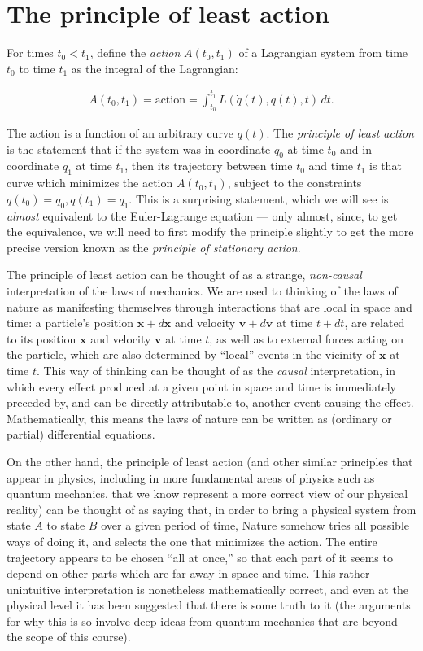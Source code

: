 \documentclass[11pt]{report}
\theoremstyle{plain}
\theoremstyle{definition}
\begin{document}
\section{The principle of least action}
For times $t_0<t_1$, define the \emph{action} $A(t_0,t_1)$
of a Lagrangian system from time $t_0$ to time $t_1$
as the integral of the Lagrangian:

\begin{align*}
A(t_0,t_1)=\textrm{action} = \int_{t_0}^{t_1} L(\dot{q}(t),q(t),t)\,dt.
\end{align*}

The action is a function of an arbitrary curve $q(t)$.
The \emph{principle of least action} is the statement that
if the system was in coordinate $q_0$ at time $t_0$
and in coordinate $q_1$ at time $t_1$, then its
trajectory between time $t_0$ and time $t_1$ is that
curve which minimizes the action $A(t_0,t_1)$,
subject to the constraints $q(t_0)=q_0, q(t_1)=q_1$.
This is a surprising statement, which we will see is
\emph{almost} equivalent to the Euler-Lagrange equation ---
only almost, since, to get the equivalence, we will
need to first modify the principle slightly to get the
more precise version known as the \emph{principle of
stationary action}.

The principle of least action can be thought of as a
strange, \emph{non-causal} interpretation of the laws of
mechanics. We are used to thinking of the laws of
nature as manifesting themselves through interactions
that are local in space and time: a particle's
position $\mathbf{x}+d\mathbf{x}$ and velocity
$\mathbf{v}+d\mathbf{v}$ at time $t+dt$, are related
to its position $\mathbf{x}$ and velocity $\mathbf{v}$
at time $t$, as well as to external forces acting on
the particle, which are also determined by ``local''
events in the vicinity of $\mathbf{x}$ at time $t$.
This way of thinking can be thought of as the \emph{causal}
interpretation, in which every effect produced at a
given point in space and time is immediately preceded
by, and can be directly attributable to, another event
causing the effect. Mathematically, this means the
laws of nature can be written as (ordinary or partial)
differential equations.

On the other hand, the principle of least action (and
other similar principles that appear in physics,
including in more fundamental areas of physics such as
quantum mechanics, that we know represent a more
correct view of our physical reality) can be thought
of as saying that, in order to bring a physical system
from state $A$ to state $B$ over a given period of
time, Nature somehow tries all possible ways of doing
it, and selects the one that minimizes the action. The
entire trajectory appears to be chosen ``all at
once,'' so that each part of it seems to depend on
other parts which are far away in space and time. This
rather unintuitive interpretation is nonetheless
mathematically correct, and even at the physical level
it has been suggested that there is some truth to it
(the arguments for why this is so involve deep ideas
from quantum mechanics that are beyond the scope of
this course).
\end{document}
